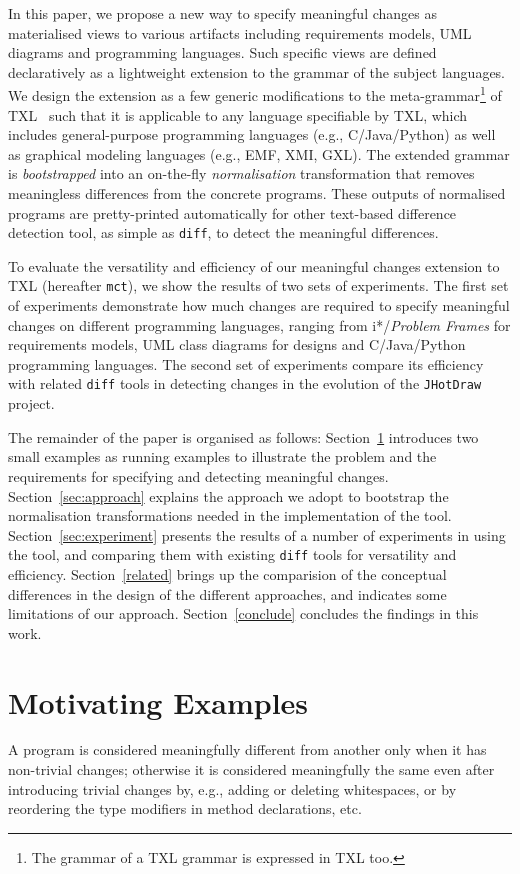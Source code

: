 \documentclass{acm_proc_article-sp}
\begin{document}
In this paper, we propose a new way to specify meaningful changes as materialised views to various artifacts including requirements models, UML diagrams and programming languages. Such specific views are defined declaratively as a lightweight extension to the grammar of the subject languages. We design the extension as a few generic modifications to the meta-grammar\footnote{The grammar of a TXL grammar is expressed in TXL too.} of TXL~\cite{txl} such that it is applicable to any language specifiable by TXL, which includes general-purpose programming languages (e.g., C/Java/Python) as well as graphical modeling languages (e.g., EMF, XMI, GXL). The extended grammar is {\em bootstrapped} into an on-the-fly {\em normalisation} transformation that removes meaningless differences from the concrete programs. These outputs of normalised programs are pretty-printed automatically for other text-based difference detection tool, as simple as {\tt diff}, to detect the meaningful differences.

To evaluate the versatility and efficiency of our meaningful changes extension to TXL (hereafter {\tt mct}), we show the results of two sets of experiments. The first set of experiments demonstrate how much changes are required to specify meaningful changes on different programming languages, ranging from i*/{\em Problem Frames} for requirements models, UML class diagrams for designs and C/Java/Python programming languages. The second set of experiments compare its efficiency with related {\tt diff} tools in detecting changes in the evolution of the {\tt JHotDraw} project.  
   
The remainder of the paper is organised as follows: Section~\ref{sec:background} introduces two small examples as running examples to illustrate the problem and the requirements for specifying and detecting meaningful changes. Section~\ref{sec:approach} explains the approach we adopt to bootstrap the normalisation transformations needed in the implementation of the tool. %
Section~\ref{sec:experiment} presents the results of a number of experiments in using the tool, and comparing them with existing {\tt diff} tools for versatility and efficiency. Section~\ref{related} brings up the comparision of the conceptual differences in the design of the different approaches, and indicates some limitations of our approach. Section~\ref{conclude} concludes the findings in this work.

\section{Motivating Examples}\label{sec:background}
A program is considered meaningfully different from another only when it has non-trivial changes; otherwise it is considered meaningfully the same even after introducing trivial changes by, e.g., adding or deleting whitespaces, or by reordering the type modifiers in method declarations, etc. 
\end{document}
